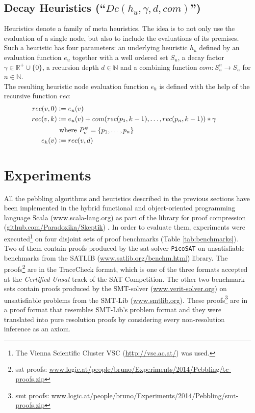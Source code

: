 \documentclass{llncs}
\newcommand{\defeq}{\mathrel{\mathop:}=}
\newcommand{\Premises}[2]{P_{#1}^{#2}}
\begin{document}
\subsection{Decay Heuristics (``$Dc(h_u,\gamma,d,com)$'') }
\label{sec:decay}
 Heuristics denote a family of meta heuristics. 
The idea is to not only use the evaluation of a single node, but also to include the evaluations of its premises.
Such a heuristic has four parameters: an underlying heuristic $h_u$ defined by an evaluation function $e_u$ together with a well ordered set $S_u$, a decay factor $\gamma \in \mathbb{R}^+ \cup \{0\}$, a recursion depth $d \in \mathbb{N}$ and a combining function $com: S_u^n \rightarrow S_u$ for $n \in \mathbb{N}$.\\
The resulting heuristic node evaluation function $e_h$ is defined with the help of the recursive function $rec$:
\begin{align*}
	rec(\n,0) &\defeq e_u(\n) \\
	rec(\n,k) &\defeq e_u(\n) + com(rec(p_1,k-1),\ldots,rec(p_n,k-1)) * \gamma\\
	& \text{ where } \Premises{\n}{\psi} = \{p_1,\ldots,p_n\}\\
	e_h(\n) &\defeq rec(\n,d) &
\end{align*}


\section{Experiments} 
\label{sec:exp}


All the pebbling algorithms and heuristics described in the previous sections have been implemented in the hybrid functional and object-oriented programming
language Scala (\url{www.scala-lang.org}) as part of the \skeptik library for proof compression (\url{github.com/Paradoxika/Skeptik}) \cite{Skeptik}.
In order to evaluate them, experiments were executed\footnote{The Vienna Scientific Cluster VSC 
(\url{http://vsc.ac.at/}) was used.} on four disjoint sets of proof benchmarks (Table \ref{tab:benchmarks}). Two of them contain proofs produced by the sat-solver \texttt{PicoSAT} \cite{Biere_picosatessentials} on unsatisfiable benchmarks from the SATLIB (\url{www.satlib.org/benchm.html}) library. The proofs\footnote{sat proofs: \url{www.logic.at/people/bruno/Experiments/2014/Pebbling/tc-proofs.zip}} are in the TraceCheck format, which is one of the three formats accepted at the \emph{Certified Unsat} track of the SAT-Competition.
The other two benchmark sets contain proofs produced by the SMT-solver {\veriT} (\url{www.verit-solver.org}) 
on unsatisfiable problems from the SMT-Lib (\url{www.smtlib.org}). These proofs\footnote{smt proofs: \url{www.logic.at/people/bruno/Experiments/2014/Pebbling/smt-proofs.zip}} are in a proof format that resembles SMT-Lib's problem format and they were translated into pure resolution proofs by considering every non-resolution inference as an axiom.
\end{document}
